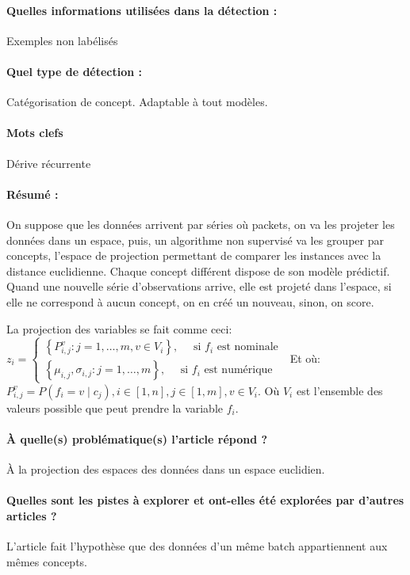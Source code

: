 \documentclass[11pt,a4paper]{report}
\begin{document}
\paragraph{Quelles informations utilisées dans la détection :} Exemples non labélisés
\paragraph{Quel type de détection :} Catégorisation de concept. Adaptable à tout modèles.

\paragraph{Mots clefs} Dérive récurrente

\paragraph{Résumé :} On suppose que les données arrivent par séries où packets, on va les projeter les données dans un espace, puis, un algorithme non supervisé va les grouper par concepts, l'espace de projection permettant de comparer les instances avec la distance euclidienne. Chaque concept différent dispose de son modèle prédictif. Quand une nouvelle série d'observations arrive, elle est projeté dans l'espace, si elle ne correspond à aucun concept, on en créé un nouveau, sinon, on score.

La projection des variables se fait comme ceci: $z_{i}=\left\{\begin{array}{l}
\left\{P_{i, j}^{v}: j=1, \ldots, m, v \in V_{i}\right\}, \quad \text { si } f_{i} \text { est nominale } \\
\left\{\mu_{i, j}, \sigma_{i, j}: j=1, \ldots, m\right\}, \quad \text { si } f_{i} \text { est numérique }
\end{array}\right.$
Et où:
$P_{i, j}^{v}=P\left(f_{i}=v \mid c_{j}\right), i \in[1, n], j \in[1, m], v \in V_{i}$. Où $V_{i}$ est l'ensemble des valeurs possible que peut prendre la variable $f_{i}$.
\paragraph{À quelle(s) problématique(s) l'article répond ?} À la projection des espaces des données dans un espace euclidien.

\paragraph{Quelles sont les pistes à explorer et ont-elles  été explorées par d'autres articles ?} L'article fait l'hypothèse que des données d'un même batch appartiennent aux mêmes concepts.
\end{document}
